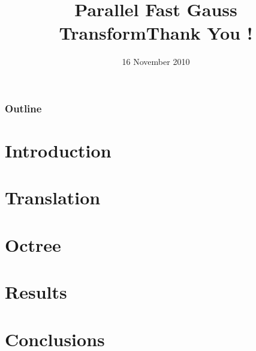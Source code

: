 \documentclass[red]{beamer}
\title{Parallel Fast Gauss Transform}
\date{16 November 2010}
\begin{document}
\begin{frame}
 \titlepage
\end{frame}

\begin{frame}
\frametitle{Outline}
\tableofcontents
\end{frame}

\section{Introduction}


\section{Translation}


\section{Octree}


\section{Results}


\section{Conclusions}




\title{Thank You !}
\author{ }
\institute{ }
\date{ }
\begin{frame}
  \titlepage
\end{frame}
\end{document}
